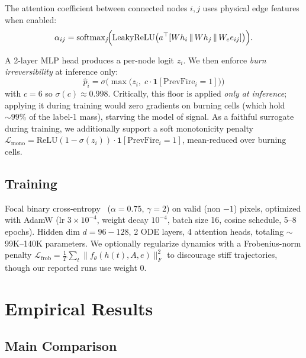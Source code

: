 \documentclass{article}
\begin{document}
The attention coefficient between connected nodes $i, j$ uses physical
edge features when enabled:
\begin{equation}\label{eq:att}
\alpha_{ij} = \mathrm{softmax}_j\!\Bigl(\mathrm{LeakyReLU}\bigl(
  a^\top [W h_i \,\|\, W h_j \,\|\, W_e e_{ij}]
\bigr)\Bigr).
\end{equation}

A 2-layer MLP head produces a per-node logit $z_i$. We then enforce
\emph{burn irreversibility} at inference only:
\begin{equation}\label{eq:mono}
\hat{p}_i = \sigma\!\bigl(\max\!\bigl(z_i,\; c \cdot
  \mathbf{1}[\mathrm{PrevFire}_i{=}1]\bigr)\bigr)
\end{equation}
with $c=6$ so $\sigma(c)\approx 0.998$. Critically, this floor is applied
\emph{only at inference}; applying it during training would zero gradients on
burning cells (which hold ${\sim}99\%$ of the label-1 mass), starving the
model of signal. As a faithful surrogate during training, we additionally
support a soft monotonicity penalty
$\mathcal{L}_{\mathrm{mono}} = \mathrm{ReLU}(1-\sigma(z_i)) \cdot
\mathbf{1}[\mathrm{PrevFire}_i{=}1]$, mean-reduced over burning cells.

\subsection{Training}

Focal binary cross-entropy~\cite{lin2017focal}
($\alpha{=}0.75$, $\gamma{=}2$) on valid (non $-1$) pixels, optimized with
AdamW (lr $3{\times}10^{-4}$, weight decay $10^{-4}$, batch size 16, cosine
schedule, 5--8 epochs). Hidden dim $d{=}96{-}128$, 2 ODE layers, 4 attention
heads, totaling $\sim$99K--140K parameters. We optionally regularize
dynamics with a Frobenius-norm penalty
$\mathcal{L}_{\mathrm{frob}} = \tfrac{1}{T}\sum_t \|f_\theta(h(t),A,e)\|_F^2$
to discourage stiff trajectories, though our reported runs use weight 0.

\section{Empirical Results}\label{sec:results}

\subsection{Main Comparison}
\end{document}
